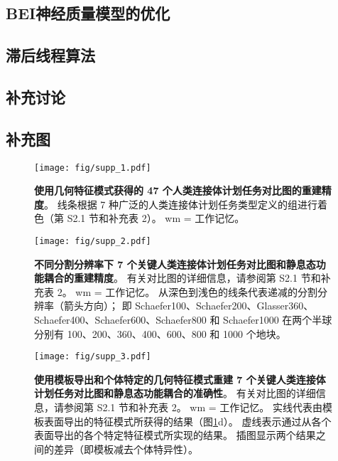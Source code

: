 \documentclass[lang=cn,a4paper,newtx]{elegantpaper}
\begin{document}
\subsection{BEI神经质量模型的优化} \label{sec:mass_optimization}


\subsection{滞后线程算法} \label{sec:lag_threads}


\subsection{补充讨论} \label{sec:supplementary_discussion}






\subsection{补充图}

\begin{figure}[!htb] 
	\centering
	\texttt{[image: fig/supp\_1.pdf]}
	\caption{\textbf{使用几何特征模式获得的 47 个人类连接体计划任务对比图的重建精度}。
		线条根据 7 种广泛的人类连接体计划任务类型定义的组进行着色（第 S2.1 节和补充表 2）。 wm = 工作记忆。} \label{fig:supp_1}
\end{figure}



\begin{figure}[!htb] 
	\centering
	\texttt{[image: fig/supp\_2.pdf]}
	\caption{\textbf{不同分割分辨率下 7 个关键人类连接体计划任务对比图和静息态功能耦合的重建精度}。 
		有关对比图的详细信息，请参阅第 S2.1 节和补充表 2。
		wm = 工作记忆。
		从深色到浅色的线条代表递减的分割分辨率（箭头方向）；
		即 Schaefer100、Schaefer200、Glasser360、Schaefer400、Schaefer600、Schaefer800 和 Schaefer1000 在两个半球分别有 100、200、360、400、600、800 和 1000 个地块。} \label{fig:supp_2}
\end{figure}



\begin{figure}[!htb] 
	\centering
	\texttt{[image: fig/supp\_3.pdf]}
	\caption{\textbf{使用模板导出和个体特定的几何特征模式重建 7 个关键人类连接体计划任务对比图和静息态功能耦合的准确性}。
		有关对比图的详细信息，请参阅第 S2.1 节和补充表 2。 
		wm = 工作记忆。
		实线代表由模板表面导出的特征模式所获得的结果（图\ref{fig:supp_1}d）。
		虚线表示通过从各个表面导出的各个特定特征模式所实现的结果。
		插图显示两个结果之间的差异（即模板减去个体特异性）。} \label{fig:supp_3}
\end{figure}
\end{document}
